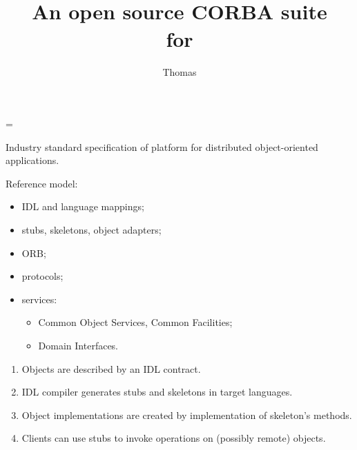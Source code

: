 \documentclass[a4,slidesec]{seminar}
\title{\large\sffamily
\ab{}\\
An open source CORBA suite\\
for \ada{}}
\author{Thomas \nom{Quinot}}
\date{}
\newif\ifpdf
\begin{document}

\headwidth=\textwidth
\addtolength{\headheight}{0.8cm}
\addtolength{\footheight}{24pt}
\addtolength{\slideheight}{-\headheight}
\renewcommand{\slideleftmargin}{1cm}
\renewcommand{\sliderightmargin}{1cm}


\begin{slide}
\maketitle
\end{slide}


\begin{slide}

Industry standard specification of platform for distributed object-oriented
applications.

Reference model:
\begin{itemize}
\item IDL and language mappings;
\item stubs, skeletons, object adapters;
\item ORB;
\item protocols;
\item services:
  \begin{itemize}
  \item Common Object Services, Common Facilities;
  \item Domain Interfaces.
  \end{itemize}
\end{itemize}

\end{slide}

\begin{slide}

\begin{center}
\ifpdf\pdfimage width 8cm {corbaglobal.pdf}
\else{}
\fi
\end{center}

\end{slide}


\begin{slide}


\begin{enumerate}
\item Objects are described by an IDL contract.
\item IDL compiler generates stubs and skeletons in
  target languages.
\item Object implementations are created by implementation
  of skeleton's methods.
\item Clients can use stubs to invoke operations on
  (possibly remote) objects.
\end{enumerate}

\end{slide}
\end{document}
